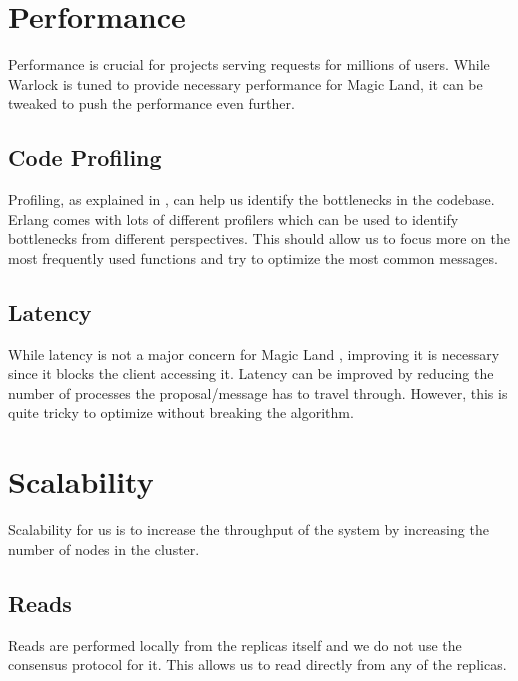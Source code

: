 \section{Performance}

Performance is crucial for projects serving requests for millions of users.
While Warlock is tuned to provide necessary performance for Magic Land, it
can be tweaked to push the performance even further.

\subsection{Code Profiling}

Profiling, as explained in , can help us identify the
bottlenecks in the codebase. Erlang comes with lots of different profilers
which can be used to identify bottlenecks from different perspectives. This
should allow us to focus more on the most frequently used functions and try
to optimize the most common messages.

\subsection{Latency}

While latency is not a major concern for Magic Land%
, improving it is necessary since it blocks the client accessing it. Latency
can be improved by reducing the number of processes the proposal/message has
to travel through. However, this is quite tricky to optimize without breaking
the algorithm.

\section{Scalability}

Scalability for us is to increase the throughput of the system
by increasing the number of nodes in the cluster.

\subsection{Reads}

Reads are performed locally from the replicas itself and we do not use the
consensus protocol for it. This allows us to read directly from any of the
replicas.

